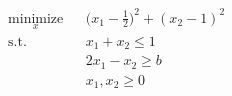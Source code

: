 \begin{equation*}
\begin{aligned}
    & \underset{x}{\text{minimize}} & & \biggl(x_1-\frac{1}{2} \biggr)^2 + (x_2 - 1)^2 \\
    &\text{s.t.} && x_1 + x_2 \leq 1 \\
    &&&             2x_1 - x_2 \geq b \\
    &&&             x_1, x_2 \geq 0
\end{aligned}
\end{equation*}
